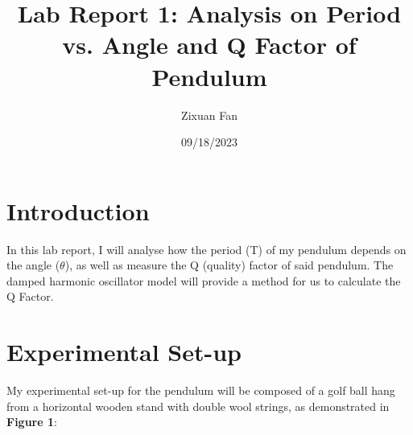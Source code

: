 \documentclass{article}
\title{Lab Report 1: Analysis on Period vs. Angle and Q Factor of Pendulum}
\author{Zixuan Fan}
\date{09/18/2023}
\begin{document}
\maketitle
\section{Introduction}

In this lab report, I will analyse how the period (T) of my pendulum depends on the angle ($\theta$), as well as measure the Q (quality) factor of said pendulum. The damped harmonic oscillator model will provide a method for us to calculate the Q Factor.

\section{Experimental Set-up}

My experimental set-up for the pendulum will be composed of a golf ball hang from a horizontal wooden stand with double wool strings, as demonstrated in \textbf{Figure 1}:
\end{document}
